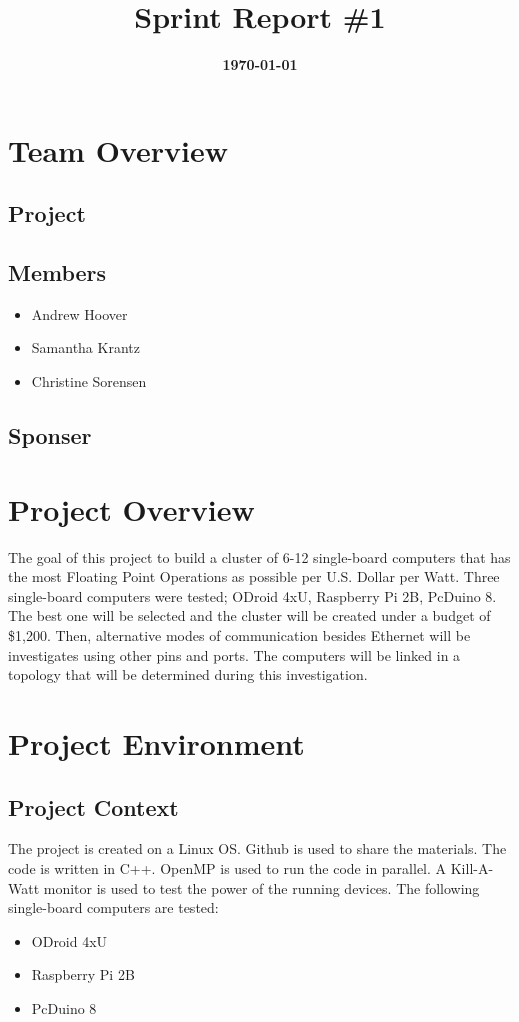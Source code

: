 \documentclass{article}
\title{\normalfont\Large\bfseries\color{TitleColor}Sprint Report \#1}
\date{\normalfont\bfseries\color{TitleColor}\today}
\begin{document}
\maketitle

\section*{Team Overview}
\subsection*{Project}

\subsection*{Members}
\begin{itemize}
	\item Andrew Hoover
	\item Samantha Krantz
	\item Christine Sorensen
\end{itemize}

\subsection*{Sponser}

\section*{Project Overview}
The goal of this project to build a cluster of 6-12 single-board computers that has the most Floating Point Operations as possible per U.S. Dollar per Watt. Three single-board computers were tested; ODroid 4xU, Raspberry Pi 2B, PcDuino 8. The best one will be selected and the cluster will be created under a budget of \$1,200. Then, alternative modes of communication besides Ethernet will be investigates using other pins and ports. The computers will be linked in a topology that will be determined during this investigation.

\section*{Project Environment}
\subsection*{Project Context}
The project is created on a Linux OS. Github is used to share the materials. The code is written in C++. OpenMP is used to run the code in parallel. A Kill-A-Watt monitor is used to test the power of the running devices.
\newline \newline The following single-board computers are tested:
\begin{itemize}
	\item ODroid 4xU
	\item Raspberry Pi 2B
	\item PcDuino 8
\end{itemize} 
\end{document}
